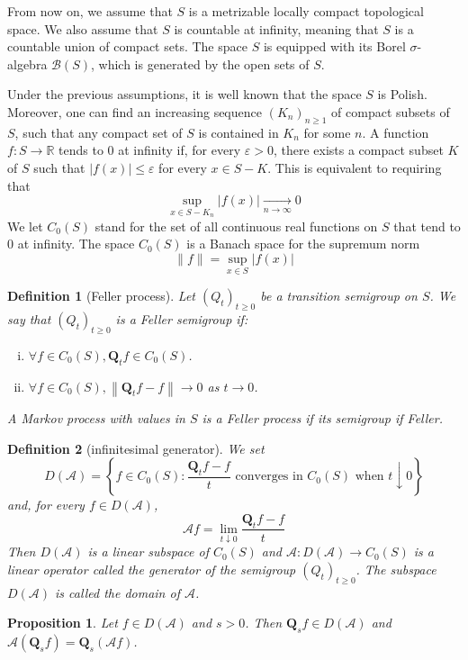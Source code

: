 \documentclass{report}
\newtheorem{definition}{Definition}[section]
\newtheorem{proposition}{Proposition}[section]
\theoremstyle{nonumberplain}
\begin{document}
 From now on, we assume that $S$ is a metrizable locally compact topological space. We also assume that $S$ is countable at infinity, meaning that $S$ is a countable union of compact sets. The space $S$ is equipped with its Borel $\sigma$-algebra $\mathcal{B}(S)$, which is generated by the open sets of $S$.

Under the previous assumptions, it is well known that the space $S$ is Polish. Moreover, one can find an increasing sequence $\left(K_n\right)_{n \geq 1}$ of compact subsets of $S$, such that any compact set of $S$ is contained in $K_n$ for some $n$. A function $f: S \to \mathbb{R}$ tends to 0 at infinity if, for every $\varepsilon>0$, there exists a compact subset $K$ of $S$ such that $|f(x)| \leq \varepsilon$ for every $x \in S - K$. This is equivalent to requiring that
$$
\sup _{x \in S - K_n}|f(x)| \underset{n \rightarrow \infty}{\longrightarrow} 0
$$
We let $C_0(S)$ stand for the set of all continuous real functions on $S$ that tend to 0 at infinity. The space $C_0(S)$ is a Banach space for the supremum norm
$$
\|f\|=\sup _{x \in S}|f(x)|
$$
\begin{definition}[Feller process]
Let $\left(Q_t\right)_{t \geq 0}$ be a transition semigroup on $S$. We say that $\left(Q_t\right)_{t \geq 0}$ is a \emph{Feller semigroup} if:
\begin{enumerate}[(i)]
\item $\forall f \in C_0(S), \mathbf{Q}_t f \in C_0(S)$.
\item $\forall f \in C_0(S),\left\|\mathbf{Q}_t f-f\right\| \longrightarrow 0$ as $t \rightarrow 0$.
\end{enumerate}
A Markov process with values in $S$ is a \emph{Feller process} if its semigroup if Feller.
\end{definition}
\begin{definition}[infinitesimal generator]
We set
$$
D(\mathcal{A})=\left\{f \in C_0(S): \frac{ \mathbf{Q}_t f-f}{t} \text { converges in } C_0(S) \text { when } t \downarrow 0\right\}
$$
and, for every $f \in D(\mathcal{A})$,
$$
\mathcal{A}f=\lim _{t \downarrow 0} \frac{ \mathbf{Q}_t f-f}{t}
$$
Then $D(\mathcal{A})$ is a linear subspace of $C_0(S)$ and $\mathcal{A}: D(\mathcal{A}) \longrightarrow C_0(S)$ is a linear operator called the generator of the semigroup $\left( Q_t\right)_{t \geq 0}$. The subspace $D(\mathcal{A})$ is called the domain of $\mathcal{A}$.
\end{definition}
\begin{proposition}
	Let $f \in D(\mathcal{A})$ and $s>0$. Then $\mathbf{Q}_s f \in D(\mathcal{A})$ and $\mathcal{A}\left(\mathbf{Q}_s f\right)=\mathbf{Q}_s(\mathcal{A} f)$.
\end{proposition}
\end{document}
